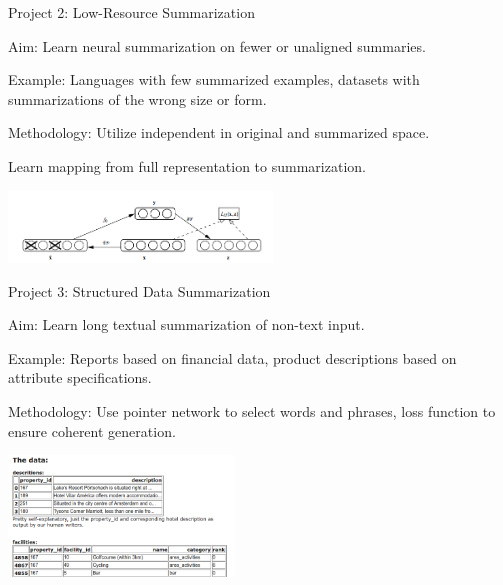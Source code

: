 \documentclass{beamer}
\let\tempone\itemize
\let\temptwo\enditemize
\renewenvironment{itemize}{\tempone\addtolength{\itemsep}{0.5\baselineskip}}{\temptwo}
\begin{document}
\begin{frame}{Project 2: Low-Resource Summarization}
  \begin{itemize}
  \item Aim: Learn neural summarization on fewer or unaligned summaries.
  \item Example: Languages with few summarized examples, 
    datasets with summarizations of the wrong size or form.
  \item Methodology: Utilize independent  in 
    original and summarized space. 
  \item Learn mapping from full representation to summarization.  
  \end{itemize}

  \begin{center}
    \includegraphics[width=7cm]{denoising}
  \end{center}
\end{frame}

\begin{frame}{Project 3: Structured Data Summarization}
  \begin{itemize}
    \item Aim: Learn long textual summarization of non-text input. 
    \item Example: Reports based on financial data, product descriptions based on 
      attribute specifications.
    \item Methodology: Use pointer network to select words and phrases, loss function 
      to ensure coherent generation.
  \end{itemize}

  \begin{center}
    \includegraphics[width=6cm]{booking}
  \end{center}
\end{frame}

  
\end{document}
